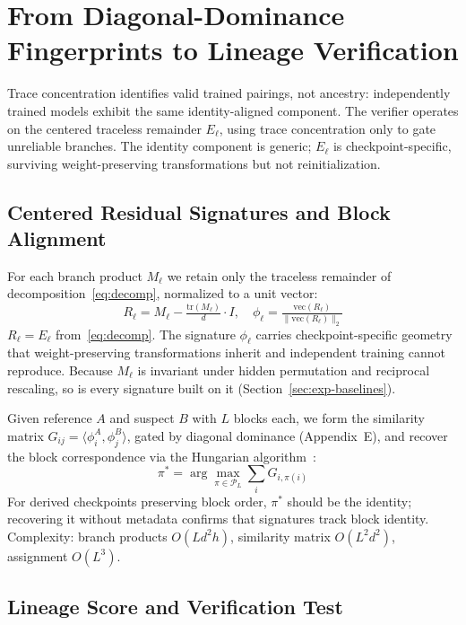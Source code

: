 \documentclass[letterpaper]{article}
\begin{document}
\section{From Diagonal-Dominance Fingerprints to Lineage Verification}\label{sec:verification}

Trace concentration identifies valid trained pairings, not ancestry: independently trained models exhibit the same identity-aligned component. The verifier operates on the centered traceless remainder $E_\ell$, using trace concentration only to gate unreliable branches. The identity component is generic; $E_\ell$ is checkpoint-specific, surviving weight-preserving transformations but not reinitialization.

\subsection{Centered Residual Signatures and Block Alignment}\label{sec:pairing}

For each branch product $M_\ell$ we retain only the traceless remainder of decomposition~\eqref{eq:decomp}, normalized to a unit vector:
\begin{equation}\label{eq:centered-fingerprint}
R_\ell = M_\ell - \tfrac{\mathrm{tr}(M_\ell)}{d} \cdot I, \quad
\phi_\ell = \tfrac{\mathrm{vec}(R_\ell)}{\|\mathrm{vec}(R_\ell)\|_2}
\end{equation}
$R_\ell = E_\ell$ from~\eqref{eq:decomp}. The signature $\phi_\ell$ carries checkpoint-specific geometry that weight-preserving transformations inherit and independent training cannot reproduce. Because $M_\ell$ is invariant under hidden permutation and reciprocal rescaling, so is every signature built on it (Section~\ref{sec:exp-baselines}).

Given reference $A$ and suspect $B$ with $L$ blocks each, we form the similarity matrix $G_{ij} = \langle \phi^A_i, \phi^B_j \rangle$, gated by diagonal dominance (Appendix~E), and recover the block correspondence via the Hungarian algorithm~\citep{kuhn1955hungarian}:
\begin{equation}\label{eq:hungarian}
\pi^* = \arg\max_{\pi \in \mathcal{P}_L} \sum_{i} G_{i,\pi(i)}
\end{equation}
For derived checkpoints preserving block order, $\pi^*$ should be the identity; recovering it without metadata confirms that signatures track block identity. Complexity: branch products $O(Ld^2 h)$, similarity matrix $O(L^2 d^2)$, assignment $O(L^3)$.

\subsection{Lineage Score and Verification Test}\label{sec:lineage-score}
\end{document}
